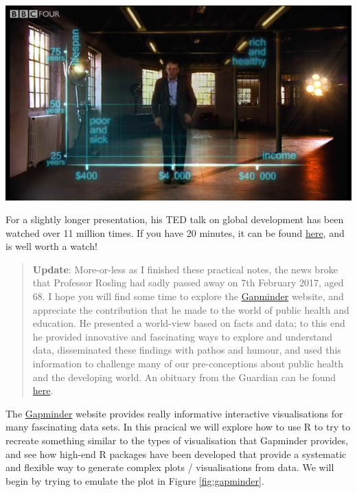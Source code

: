 \documentclass[]{book}
\theoremstyle{definition}
\theoremstyle{definition}
\theoremstyle{definition}
\theoremstyle{remark}
\begin{document}
\begin{center}\includegraphics{images/hans} \end{center}

For a slightly longer presentation, his TED talk on global development
has been watched over 11 million times. If you have 20 minutes, it can
be found
\href{https://www.ted.com/talks/hans_rosling_shows_the_best_stats_you_ve_ever_seen?utm_source=tedcomshare\&utm_medium=referral\&utm_campaign=tedspread}{here},
and is well worth a watch!

\begin{quote}
\textbf{Update}: More-or-less as I finished these practical notes, the
news broke that Professor Rosling had sadly passed away on 7th February
2017, aged 68. I hope you will find some time to explore the
\href{https://www.gapminder.org/}{Gapminder} website, and appreciate the
contribution that he made to the world of public health and education.
He presented a world-view based on facts and data; to this end he
provided innovative and fascinating ways to explore and understand data,
disseminated these findings with pathos and humour, and used this
information to challenge many of our pre-conceptions about public health
and the developing world. An obituary from the Guardian can be found
\href{https://www.theguardian.com/global-development/2017/feb/07/hans-rosling-obituary}{here}.
\end{quote}

The \href{https://www.gapminder.org/}{Gapminder} website provides really
informative interactive visualisations for many fascinating data sets.
In this pracical we will explore how to use R to try to recreate
something similar to the types of visualisation that Gapminder provides,
and see how high-end R packages have been developed that provide a
systematic and flexible way to generate complex plots / visualisations
from data. We will begin by trying to emulate the plot in Figure
\ref{fig:gapminder}.
\end{document}
